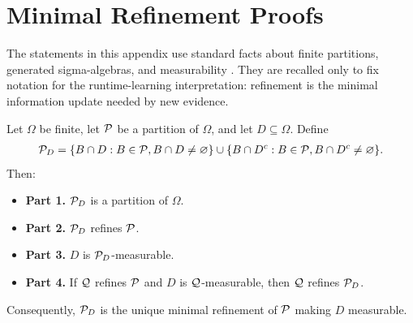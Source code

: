 \section{Minimal Refinement Proofs}
\label{app:refinement-proofs}

The statements in this appendix use standard facts about finite partitions, generated sigma-algebras, and measurability \citep{billingsley1995probability,kallenberg2002foundations}. They are recalled only to fix notation for the runtime-learning interpretation: refinement is the minimal information update needed by new evidence.

\begin{theorem}
\label{thm:minimal-refinement:formal}
Let $\Omega$ be finite, let $\mathcal{P}$ be a partition of $\Omega$, and let $D\subseteq\Omega$. Define
\begin{align*}
\mathcal{P}_D=\{B\cap D:B\in\mathcal{P}, B\cap D\ne\varnothing\}\cup\{B\cap D^c:B\in\mathcal{P}, B\cap D^c\ne\varnothing\}.
\end{align*}
Then:
\begin{itemize}
\item {\bf Part 1.} $\mathcal{P}_D$ is a partition of $\Omega$.
\item {\bf Part 2.} $\mathcal{P}_D$ refines $\mathcal{P}$.
\item {\bf Part 3.} $D$ is $\mathcal{P}_D$-measurable.
\item {\bf Part 4.} If $\mathcal{Q}$ refines $\mathcal{P}$ and $D$ is $\mathcal{Q}$-measurable, then $\mathcal{Q}$ refines $\mathcal{P}_D$.
\end{itemize}
Consequently, $\mathcal{P}_D$ is the unique minimal refinement of $\mathcal{P}$ making $D$ measurable.
\end{theorem}
